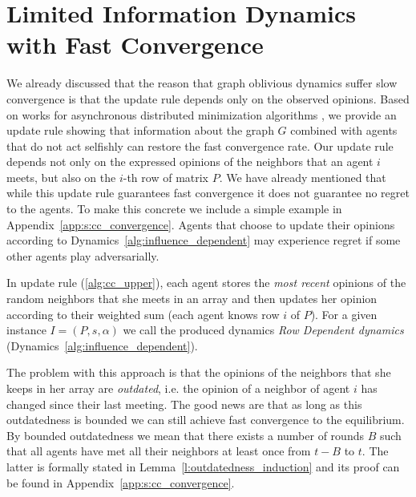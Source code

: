 \section{Limited Information Dynamics with Fast Convergence}\label{s:cc_convergence}

We already discussed that the reason that graph oblivious dynamics suffer slow
convergence is that the update rule depends only on the observed opinions.
Based on works for asynchronous distributed minimization algorithms
\cite{BT97,CC16}, we provide an update rule showing that information about the
graph $G$ combined with agents that do not act selfishly can restore the
fast convergence rate.
Our update rule depends not only on the expressed opinions of the
neighbors that an agent $i$ meets, but also on the $i$-th row of matrix $P$.
We have already mentioned that while this update rule guarantees fast convergence
it does not guarantee no regret to the agents.  To make this concrete we include
a simple example in Appendix~\ref{app:s:cc_convergence}.  Agents that choose
to update their opinions according to Dynamics~\ref{alg:influence_dependent}
may experience regret if some other agents play adversarially.

In update rule (\ref{alg:cc_upper}), each agent stores the
\emph{most recent} opinions of the random neighbors that she meets in an array
and then updates her opinion according to their weighted sum
(each agent knows row $i$ of $P$). For a given instance
$I=(P,s,\alpha)$ we call the produced dynamics \emph{Row Dependent dynamics}
(Dynamics~\ref{alg:influence_dependent}).

The problem with this approach is that the opinions of the neighbors
that she keeps in her array are \emph{outdated}, i.e. the opinion of
a neighbor of agent $i$ has changed since their last meeting.
The good news are that as long as this outdatedness
is bounded we can still achieve fast convergence to the
equilibrium.  By bounded outdatedness we mean that there exists a
number of rounds $B$ such that all agents have met all their neighbors
at least once from $t-B$ to $t$.  The latter is formally stated in
Lemma~\ref{l:outdatedness_induction} and its proof can be found in
Appendix~\ref{app:s:cc_convergence}.

